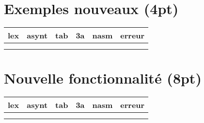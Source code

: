 \documentclass[12pt,a4paper]{article}
\begin{document}
\section{Exemples nouveaux (4pt)}

\begin{longtable}{|p{2.2cm}|p{2.2cm}|p{2.2cm}|p{2.2cm}|p{2.2cm}|p{2.2cm}|} \hline
lex & asynt & tab & 3a & nasm & erreur\\ \hline
& & & & & \\ 
& & & & & \\ \hline
\end{longtable}

\section{Nouvelle fonctionnalité (8pt)}

\begin{longtable}{|p{2.2cm}|p{2.2cm}|p{2.2cm}|p{2.2cm}|p{2.2cm}|p{2.2cm}|} \hline
lex & asynt & tab & 3a & nasm & erreur\\ \hline
& & & & & \\ 
& & & & & \\ \hline
\end{longtable}
\end{document}
